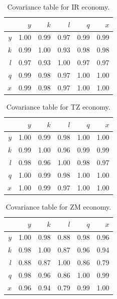 \documentclass[preprint,authoryear,12pt]{elsarticle}\usepackage{graphicx, color}
\begin{document}
\begin{table}[H]
\begin{center}
\caption{Covariance table for  IR economy.}
\label{tab:Covar_IR}
\begin{tabular}{rrrrrr}
  \hline
 & $y$ & $k$ & $l$ & $q$ & $x$ \\ 
  \hline
$y$ & 1.00 & 0.99 & 0.97 & 0.99 & 0.99 \\ 
  $k$ & 0.99 & 1.00 & 0.93 & 0.98 & 0.98 \\ 
  $l$ & 0.97 & 0.93 & 1.00 & 0.97 & 0.97 \\ 
  $q$ & 0.99 & 0.98 & 0.97 & 1.00 & 1.00 \\ 
  $x$ & 0.99 & 0.98 & 0.97 & 1.00 & 1.00 \\ 
   \hline
\end{tabular}
\end{center}
\end{table}



\begin{table}[H]
\begin{center}
\caption{Covariance table for  TZ economy.}
\label{tab:Covar_TZ}
\begin{tabular}{rrrrrr}
  \hline
 & $y$ & $k$ & $l$ & $q$ & $x$ \\ 
  \hline
$y$ & 1.00 & 0.99 & 0.98 & 1.00 & 1.00 \\ 
  $k$ & 0.99 & 1.00 & 0.96 & 0.99 & 0.99 \\ 
  $l$ & 0.98 & 0.96 & 1.00 & 0.98 & 0.97 \\ 
  $q$ & 1.00 & 0.99 & 0.98 & 1.00 & 1.00 \\ 
  $x$ & 1.00 & 0.99 & 0.97 & 1.00 & 1.00 \\ 
   \hline
\end{tabular}
\end{center}
\end{table}



\begin{table}[H]
\begin{center}
\caption{Covariance table for  ZM economy.}
\label{tab:Covar_ZM}
\begin{tabular}{rrrrrr}
  \hline
 & $y$ & $k$ & $l$ & $q$ & $x$ \\ 
  \hline
$y$ & 1.00 & 0.98 & 0.88 & 0.98 & 0.96 \\ 
  $k$ & 0.98 & 1.00 & 0.87 & 0.96 & 0.94 \\ 
  $l$ & 0.88 & 0.87 & 1.00 & 0.86 & 0.79 \\ 
  $q$ & 0.98 & 0.96 & 0.86 & 1.00 & 0.99 \\ 
  $x$ & 0.96 & 0.94 & 0.79 & 0.99 & 1.00 \\ 
   \hline
\end{tabular}
\end{center}
\end{table}
\end{document}

